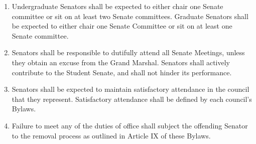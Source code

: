 
\begin{enumerate}

\item Undergraduate Senators shall be expected to either chair one Senate committee or sit on at least two Senate committees.
Graduate Senators shall be expected to either chair one Senate Committee or sit on at least one Senate committee.

\item Senators shall be responsible to dutifully attend all Senate Meetings, unless they obtain an excuse from the Grand Marshal.
Senators shall actively contribute to the Student Senate, and shall not hinder its performance.

\item Senators shall be expected to maintain satisfactory attendance in the council that they represent. Satisfactory attendance shall
be defined by each council’s Bylaws.

\item Failure to meet any of the duties of office shall subject the offending Senator to the removal process as outlined in Article IX of
these Bylaws.

\end{enumerate}